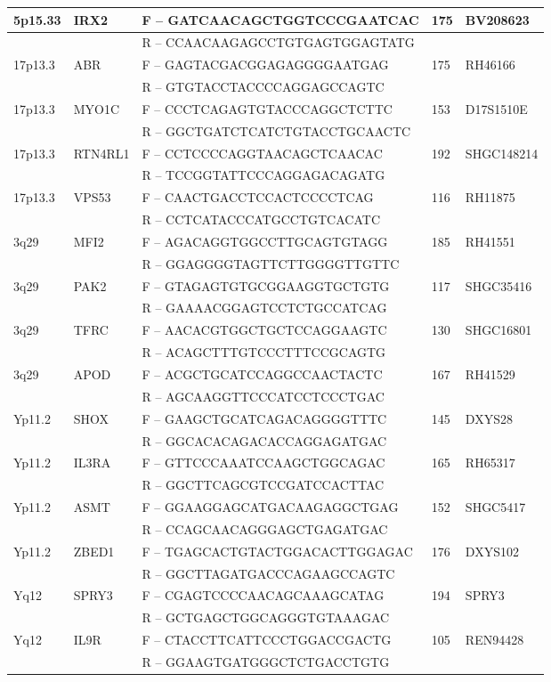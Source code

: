\begin{longtabu}{ l l l l l}
 5p15.33 & IRX2 & F – GATCAACAGCTGGTCCCGAATCAC & 175 & BV208623 \\* \midrule
  &  & R – CCAACAAGAGCCTGTGAGTGGAGTATG &  &  \\* \midrule
 17p13.3 & ABR & F – GAGTACGACGGAGAGGGGAATGAG & 175 & RH46166 \\* \midrule
  &  & R – GTGTACCTACCCCAGGAGCCAGTC &  &  \\* \midrule
 17p13.3 & MYO1C & F – CCCTCAGAGTGTACCCAGGCTCTTC & 153 & D17S1510E \\* \midrule
  &  & R – GGCTGATCTCATCTGTACCTGCAACTC &  &  \\* \midrule
 17p13.3 & RTN4RL1 & F – CCTCCCCAGGTAACAGCTCAACAC & 192 & SHGC148214 \\* \midrule
  &  & R – TCCGGTATTCCCAGGAGACAGATG &  &  \\* \midrule
 17p13.3 & VPS53 & F – CAACTGACCTCCACTCCCCTCAG & 116 & RH11875 \\* \midrule
  &  & R – CCTCATACCCATGCCTGTCACATC &  &  \\* \midrule
 3q29 & MFI2 & F – AGACAGGTGGCCTTGCAGTGTAGG & 185 & RH41551 \\* \midrule
  &  & R – GGAGGGGTAGTTCTTGGGGTTGTTC &  &  \\* \midrule
 3q29 & PAK2 & F – GTAGAGTGTGCGGAAGGTGCTGTG & 117 & SHGC35416 \\* \midrule
  &  & R – GAAAACGGAGTCCTCTGCCATCAG &  &  \\* \midrule
 3q29 & TFRC & F – AACACGTGGCTGCTCCAGGAAGTC & 130 & SHGC16801 \\* \midrule
  &  & R – ACAGCTTTGTCCCTTTCCGCAGTG &  &  \\* \midrule
 3q29 & APOD & F – ACGCTGCATCCAGGCCAACTACTC & 167 & RH41529 \\* \midrule
  &  & R – AGCAAGGTTCCCATCCTCCCTGAC &  &  \\* \midrule
 Yp11.2 & SHOX & F – GAAGCTGCATCAGACAGGGGTTTC & 145 & DXYS28 \\* \midrule
  &  & R – GGCACACAGACACCAGGAGATGAC &  &  \\* \midrule
 Yp11.2 & IL3RA & F – GTTCCCAAATCCAAGCTGGCAGAC & 165 & RH65317 \\* \midrule
  &  & R – GGCTTCAGCGTCCGATCCACTTAC &  &  \\* \midrule
 Yp11.2 & ASMT & F – GGAAGGAGCATGACAAGAGGCTGAG & 152 & SHGC5417 \\* \midrule
  &  & R – CCAGCAACAGGGAGCTGAGATGAC &  &  \\* \midrule
 Yp11.2 & ZBED1 & F – TGAGCACTGTACTGGACACTTGGAGAC & 176 & DXYS102 \\* \midrule
  &  & R – GGCTTAGATGACCCAGAAGCCAGTC &  &  \\* \midrule
 Yq12 & SPRY3 & F – CGAGTCCCCAACAGCAAAGCATAG & 194 & SPRY3 \\* \midrule
  &  & R – GCTGAGCTGGCAGGGTGTAAAGAC &  &  \\* \midrule
 Yq12 & IL9R & F – CTACCTTCATTCCCTGGACCGACTG & 105 & REN94428 \\* \midrule
  &  & R – GGAAGTGATGGGCTCTGACCTGTG &  &  \\* \midrule
\end{longtabu}
